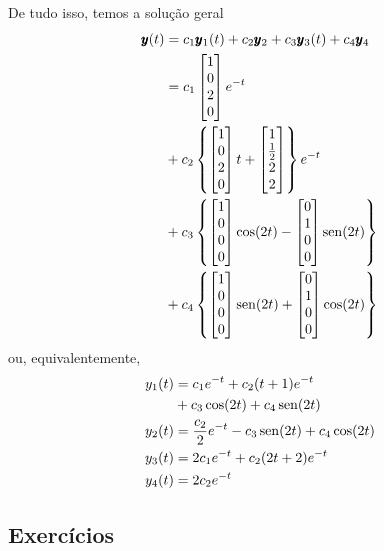 \begin{resol}
  De tudo isso, temos a solução geral
  \begin{align}
    \pmb{y}(t) &= c_1\pmb{y}_1(t) + c_2\pmb{y}_2 + c_3\pmb{y}_3(t) + c_4\pmb{y}_4 \\
    &= c_1
      \begin{bmatrix}
        1 \\
        0 \\
        2 \\
        0
      \end{bmatrix}e^{-t} \\
    &+ c_2\left\{
      \begin{bmatrix}
        1 \\
        0 \\
        2 \\
        0
      \end{bmatrix}t +
    \begin{bmatrix}
      1 \\
      \frac{1}{2} \\
      2 \\
      2
    \end{bmatrix}\right\}e^{-t} \\
    &+ c_3\left\{
      \begin{bmatrix}
        1 \\
        0 \\
        0 \\
        0
      \end{bmatrix}\cos(2t) -
    \begin{bmatrix}
      0 \\ 1 \\ 0 \\ 0
    \end{bmatrix}\operatorname{sen}(2t)\right\} \\
    &+ c_4\left\{
      \begin{bmatrix}
        1 \\
        0 \\
        0 \\
        0
      \end{bmatrix}\operatorname{sen}(2t) +
    \begin{bmatrix}
      0 \\ 1 \\ 0 \\ 0
    \end{bmatrix}\cos(2t)\right\}
  \end{align}
  ou, equivalentemente,
  \begin{align}
    y_1(t) &= c_1e^{-t} + c_2(t + 1)e^{-t} \\
           &+ c_3\cos(2t) + c_4\operatorname{sen}(2t) \\
    y_2(t) &= \frac{c_2}{2}e^{-t} - c_3\operatorname{sen}(2t) + c_4\cos(2t) \\
    y_3(t) &= 2c_1e^{-t} + c_2(2t + 2)e^{-t} \\
    y_4(t) &= 2c_2e^{-t}
  \end{align}
\end{resol}

\subsection*{Exercícios}

\emconstrucao